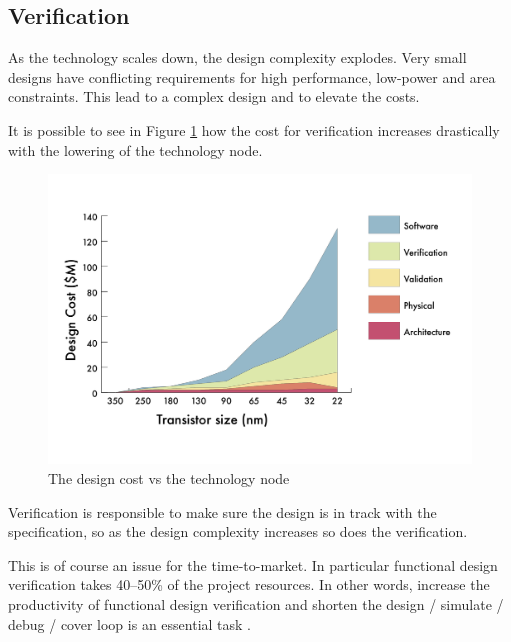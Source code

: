 \subsection{Verification}
As the technology scales down, the design complexity explodes. 
Very small designs have conflicting requirements for high performance, low-power and area constraints. 
This lead to a complex design and to elevate the costs.

It is possible to see in Figure \ref{verification-tecnology} how the cost for verification increases drastically with the lowering of the technology node.


\begin{figure}[H]
    \centering
    \includegraphics[scale = 0.4]{Chapter_1/img/cost-scale.png}
    \caption{The design cost vs the technology node \cite{verification-book-2018}}
    \label{verification-tecnology}
\end{figure}

Verification is responsible to make sure the design is in track with the specification, so as the design complexity increases so does the verification.

This is of course an issue for the time-to-market. 
In particular functional design verification takes 40–50\% of the project resources. In other words, increase the productivity of functional design verification and shorten the design / simulate / debug / cover loop is an essential task \cite{verification-book-2018}.

